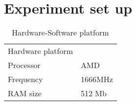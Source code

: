 \section{Experiment set up}

\begin{table}[hbp]
  \centering
  \begin{tabular}{ll}\hline
	Hardware platform\hspace{4cm}		& 	\\
	Processor			&	 AMD 	\\
	Frequency			& 1666MHz\\
	RAM size			& 512 Mb \\\hline
  \end{tabular}
  \caption{Hardware-Software platform}
  \label{tab:mytable}
\end{table}

